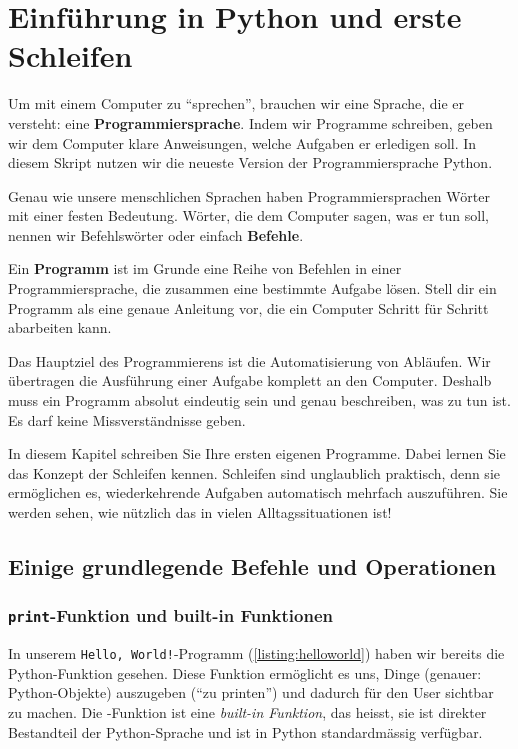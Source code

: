 \chapter{Einführung in Python und erste Schleifen}\label{ch:K01Intro}


Um mit einem Computer zu \enquote{sprechen}, brauchen wir eine Sprache, die er versteht: eine \textbf{Programmiersprache}. Indem wir Programme schreiben, geben wir dem Computer klare Anweisungen, welche Aufgaben er erledigen soll. In diesem Skript nutzen wir die neueste Version der Programmiersprache Python.

Genau wie unsere menschlichen Sprachen haben Programmiersprachen Wörter mit einer festen Bedeutung. Wörter, die dem Computer sagen, was er tun soll, nennen wir Befehlswörter oder einfach \textbf{Befehle}.

Ein \textbf{Programm} ist im Grunde eine Reihe von Befehlen in einer Programmiersprache, die zusammen eine bestimmte Aufgabe lösen. Stell dir ein Programm als eine genaue Anleitung vor, die ein Computer Schritt für Schritt abarbeiten kann.

Das Hauptziel des Programmierens ist die Automatisierung von Abläufen. Wir übertragen die Ausführung einer Aufgabe komplett an den Computer. Deshalb muss ein Programm absolut eindeutig sein und genau beschreiben, was zu tun ist. Es darf keine Missverständnisse geben.

In diesem Kapitel schreiben Sie Ihre ersten eigenen Programme. Dabei lernen Sie das Konzept der Schleifen kennen. Schleifen sind unglaublich praktisch, denn sie ermöglichen es, wiederkehrende Aufgaben automatisch mehrfach auszuführen. Sie werden sehen, wie nützlich das in vielen Alltagssituationen ist!

\section{Einige grundlegende Befehle und Operationen}

\subsection{\texorpdfstring{\lstinline|print|}{print}-Funktion und built-in Funktionen}
In unserem \texttt{Hello, World!}-Programm (\cref{listing:helloworld}) haben wir bereits die Python-Funktion  gesehen.
Diese Funktion ermöglicht es uns, Dinge (genauer: Python-Objekte) auszugeben (\enquote{zu printen}) und dadurch für den User sichtbar zu machen. Die -Funktion ist eine \textit{built-in Funktion}, das heisst, sie ist direkter Bestandteil der Python-Sprache und ist in Python standardmässig verfügbar.

